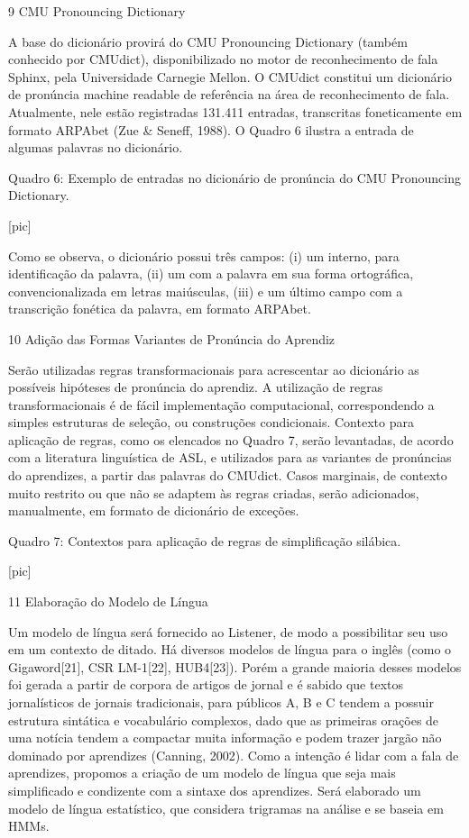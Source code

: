 9 CMU Pronouncing Dictionary

A base do dicion\'ario provir\'a do CMU Pronouncing Dictionary (tamb\'em
conhecido por CMUdict), disponibilizado no motor de reconhecimento de
fala Sphinx, pela Universidade Carnegie Mellon. O CMUdict constitui um
dicion\'ario de pron\'uncia machine readable de refer\^encia na \'area de
reconhecimento de fala. Atualmente, nele est\~ao registradas 131.411
entradas, transcritas foneticamente em formato ARPAbet (Zue \& Seneff,
1988). O Quadro 6 ilustra a entrada de algumas palavras no dicion\'ario.

Quadro 6: Exemplo de entradas no dicion\'ario de pron\'uncia do CMU
Pronouncing Dictionary.

                                [pic]

Como se observa, o dicion\'ario possui tr\^es campos: (i) um interno, para
identifica\c{c}\~ao da palavra, (ii) um com a palavra em sua forma
ortogr\'afica, convencionalizada em letras mai\'usculas, (iii) e um \'ultimo
campo com a transcri\c{c}\~ao fon\'etica da palavra, em formato ARPAbet.

10 Adi\c{c}\~ao das Formas Variantes de Pron\'uncia do Aprendiz

Ser\~ao utilizadas regras transformacionais para acrescentar ao dicion\'ario
as poss\'iveis hip\'oteses de pron\'uncia do aprendiz. A utiliza\c{c}\~ao de regras
transformacionais \'e de f\'acil implementa\c{c}\~ao computacional, correspondendo
a simples estruturas de sele\c{c}\~ao, ou constru\c{c}\~oes condicionais. Contexto
para aplica\c{c}\~ao de regras, como os elencados no Quadro 7, ser\~ao
levantadas, de acordo com a literatura lingu\'istica de ASL, e utilizados
para as variantes de pron\'uncias do aprendizes, a partir das palavras do
CMUdict. Casos marginais, de contexto muito restrito ou que n\~ao se
adaptem às regras criadas, ser\~ao adicionados, manualmente, em formato de
dicion\'ario de exce\c{c}\~oes.

Quadro 7: Contextos para aplica\c{c}\~ao de regras de simplifica\c{c}\~ao sil\'abica.

                                [pic]

11 Elabora\c{c}\~ao do Modelo de L\'ingua

Um modelo de l\'ingua ser\'a fornecido ao Listener, de modo a possibilitar
seu uso em um contexto de ditado. H\'a diversos modelos de l\'ingua para o
ingl\^es (como o Gigaword{[}21{]}, CSR LM-1{[}22{]}, HUB4{[}23{]}). Por\'em
a grande maioria desses modelos foi gerada a partir de corpora de
artigos de jornal e \'e sabido que textos jornal\'isticos de jornais
tradicionais, para p\'ublicos A, B e C tendem a possuir estrutura
sint\'atica e vocabul\'ario complexos, dado que as primeiras ora\c{c}\~oes de uma
not\'icia tendem a compactar muita informa\c{c}\~ao e podem trazer jarg\~ao n\~ao
dominado por aprendizes (Canning, 2002). Como a inten\c{c}\~ao \'e lidar com a
fala de aprendizes, propomos a cria\c{c}\~ao de um modelo de l\'ingua que seja
mais simplificado e condizente com a sintaxe dos aprendizes. Ser\'a
elaborado um modelo de l\'ingua estat\'istico, que considera trigramas na
an\'alise e se baseia em HMMs.

